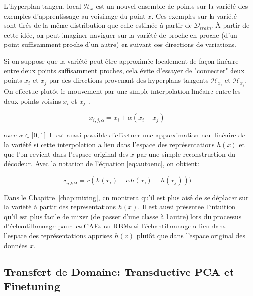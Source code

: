 L'hyperplan tangent local $\mathcal{H}_{x}$ est un nouvel ensemble de points sur la
variété des exemples d'apprentissage au voisinage du point $x$. Ces exemples
sur la variété sont tirés de la même distribution que celle estimée à partir de
$\mathcal{D}_{train}$. À partir de cette idée, on peut imaginer naviguer sur la
variété de proche en proche (d'un point suffisamment proche d'un autre) en
suivant ces directions de variations.

Si on suppose que la variété peut être approximée localement de façon linéaire
entre deux points suffisamment proches, cela évite d'essayer de "connecter"
deux points $x_i$ et $x_j$ par des directions provenant des hyperplans tangents
$\mathcal{H}_{x_i}$ et $\mathcal{H}_{x_j}$. On effectue plutôt le mouvement par une
simple interpolation linéaire entre les deux points voisins $x_{i}$ et $x_{j}$~\citep{Mesnil-et-al-LW2012}.

\begin{equation}
x_{i,j,\alpha} = x_{i} + \alpha (x_{i} - x_{j})
\end{equation}

avec $\alpha \in ]0,1[$. Il est aussi possible d'effectuer une approximation
non-linéaire de la variété si cette interpolation a lieu dans l'espace des
représentations $h(x)$ et que l'on revient dans l'espace original des $x$ par une
simple reconstruction du décodeur. Avec la notation de l'équation
\ref{eq:autoenc}, on obtient:

\begin{equation}
x_{i,j,\alpha} = r(h(x_{i}) + \alpha h(x_{i}) - h(x_{j})))
\end{equation}

Dans le Chapitre~\ref{chap:mixing}, on montrera qu'il est plus aisé de se déplacer sur la
variété à partir des représentations $h(x)$.  Il est aussi présentée
l'intuition qu'il est plus facile de mixer (de passer d'une classe à l'autre)
lors du processus d'échantillonnage pour les CAEs ou RBMs si l'échantillonnage a lieu dans
l'espace des représentations apprises $h(x)$ plutôt que dans l'espace
original des données $x$.

\subsection{Transfert de Domaine: Transductive PCA et Finetuning}

